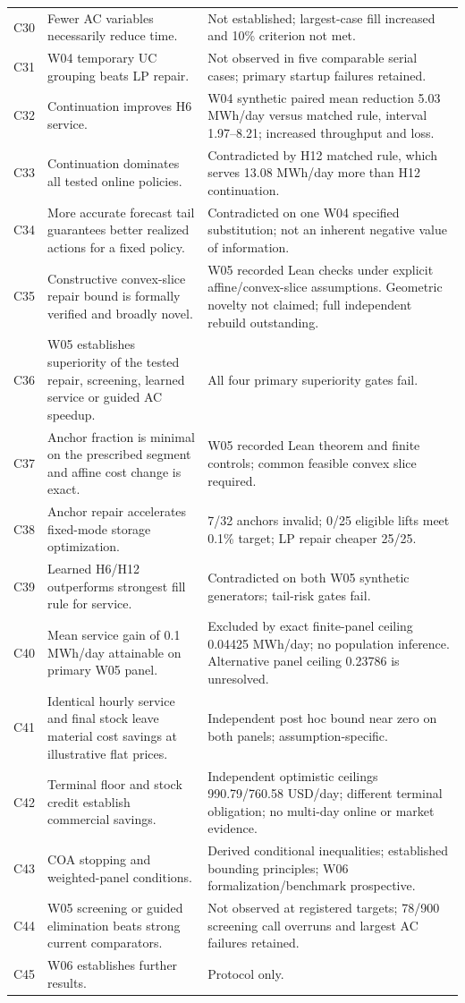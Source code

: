 \documentclass[11pt,letterpaper]{article}
\begin{document}
\begin{longtable}{P{.10\linewidth}P{.46\linewidth}P{.35\linewidth}}
C30 & Fewer AC variables necessarily reduce time. & Not established; largest-case fill increased and 10\% criterion not met.\\
C31 & W04 temporary UC grouping beats LP repair. & Not observed in five comparable serial cases; primary startup failures retained.\\
C32 & Continuation improves H6 service. & W04 synthetic paired mean reduction 5.03 MWh/day versus matched rule, interval 1.97--8.21; increased throughput and loss.\\
C33 & Continuation dominates all tested online policies. & Contradicted by H12 matched rule, which serves 13.08 MWh/day more than H12 continuation.\\
C34 & More accurate forecast tail guarantees better realized actions for a fixed policy. & Contradicted on one W04 specified substitution; not an inherent negative value of information.\\
C35 & Constructive convex-slice repair bound is formally verified and broadly novel. & W05 recorded Lean checks under explicit affine/convex-slice assumptions. Geometric novelty not claimed; full independent rebuild outstanding.\\
C36 & W05 establishes superiority of the tested repair, screening, learned service or guided AC speedup. & All four primary superiority gates fail.\\
C37 & Anchor fraction is minimal on the prescribed segment and affine cost change is exact. & W05 recorded Lean theorem and finite controls; common feasible convex slice required.\\
C38 & Anchor repair accelerates fixed-mode storage optimization. & 7/32 anchors invalid; 0/25 eligible lifts meet 0.1\% target; LP repair cheaper 25/25.\\
C39 & Learned H6/H12 outperforms strongest fill rule for service. & Contradicted on both W05 synthetic generators; tail-risk gates fail.\\
C40 & Mean service gain of 0.1 MWh/day attainable on primary W05 panel. & Excluded by exact finite-panel ceiling 0.04425 MWh/day; no population inference. Alternative panel ceiling 0.23786 is unresolved.\\
C41 & Identical hourly service and final stock leave material cost savings at illustrative flat prices. & Independent post hoc bound near zero on both panels; assumption-specific.\\
C42 & Terminal floor and stock credit establish commercial savings. & Independent optimistic ceilings 990.79/760.58 USD/day; different terminal obligation; no multi-day online or market evidence.\\
C43 & COA stopping and weighted-panel conditions. & Derived conditional inequalities; established bounding principles; W06 formalization/benchmark prospective.\\
C44 & W05 screening or guided elimination beats strong current comparators. & Not observed at registered targets; 78/900 screening call overruns and largest AC failures retained.\\
C45 & W06 establishes further results. & Protocol only.\\
\bottomrule
\end{longtable}
\end{document}
